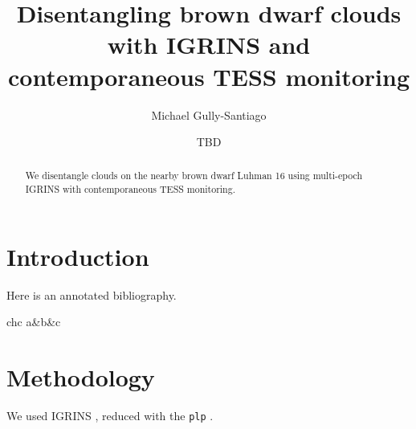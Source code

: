 \documentclass{aastex631}
\begin{document}
\title{Disentangling brown dwarf clouds with IGRINS and contemporaneous TESS monitoring}

\author{Michael Gully-Santiago}

\author{TBD}


\begin{abstract}

We disentangle clouds on the nearby brown dwarf Luhman 16 using multi-epoch IGRINS with contemporaneous TESS monitoring.

\end{abstract}


\section{Introduction}\label{sec:intro}

Here is an annotated bibliography.

\begin{deluxetable}{chc}
  \startdata
  a&b&c\\
  \enddata
\end{deluxetable}


\section{Methodology}
We used IGRINS \citep{park14,2018SPIE10702E..0QM}, reduced with the \texttt{plp} \citep{jaejoonlee16}.
\end{document}
